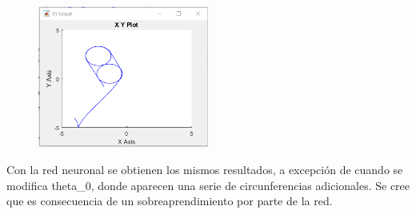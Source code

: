 \documentclass{article}
\begin{document}
\begin{figure}[h!]
    \includegraphics[width=0.5\textwidth]{imagenes/circun_desplazadas.png}
\end{figure}

Con la red neuronal se obtienen los mismos resultados, a excepción de cuando se modifica theta\_0, donde aparecen una serie de circunferencias adicionales. Se cree que es consecuencia de un sobreaprendimiento por parte de la red.
\end{document}
